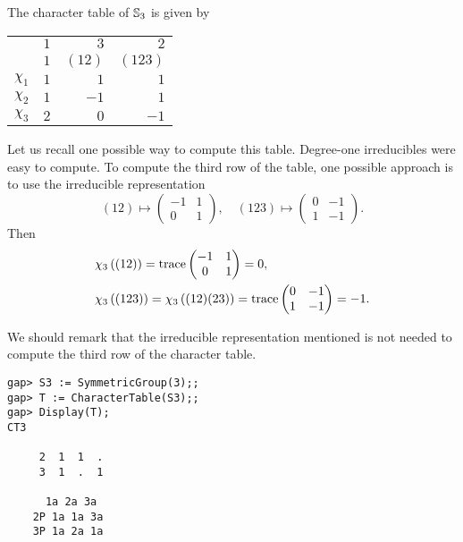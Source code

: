 \begin{example}
	The character table of $\mathbb{S}_3$ is given by 
	\begin{center}
		\begin{tabular}{|c|rrr|}
			\hline
			& $1$ & $3$ & $2$\tabularnewline
			& $1$ & $(12)$ & $(123)$ \tabularnewline
			\hline 
			$\chi_{1}$ & $1$ & $1$ & $1$\tabularnewline
			$\chi_{2}$ & $1$ & $-1$ & $1$ \tabularnewline
			$\chi_{3}$ & $2$ & $0$ & $-1$ \tabularnewline
			\hline
		\end{tabular}
	\end{center}
	Let us recall one possible way to compute this table. 
	Degree-one irreducibles were easy to compute. 
	To compute the third row of the table, one possible approach is to use
	the irreducible representation  
	\[
	(12)\mapsto \begin{pmatrix}-1&1\\0&1\end{pmatrix},
	\quad
	(123)\mapsto \begin{pmatrix}0&-1\\1&-1\end{pmatrix}.
	\]
    Then	
    \begin{align*}
		&\chi_3\left( (12) \right)=\operatorname{trace}\begin{pmatrix}-1&1\\0&1\end{pmatrix}=0,\\
		&\chi_3\left( (123) \right)=\chi_3\left( (12)(23)\right)=\operatorname{trace}\begin{pmatrix}0&-1\\1&-1\end{pmatrix}=-1.
	\end{align*}

	We should remark that the irreducible representation 
	mentioned is not needed to
	compute the third row of the character table. 
\begin{lstlisting}
gap> S3 := SymmetricGroup(3);;
gap> T := CharacterTable(S3);;
gap> Display(T);
CT3

     2  1  1  .
     3  1  .  1

      1a 2a 3a
    2P 1a 1a 3a
    3P 1a 2a 1a


\end{lstlisting}
\end{example}
